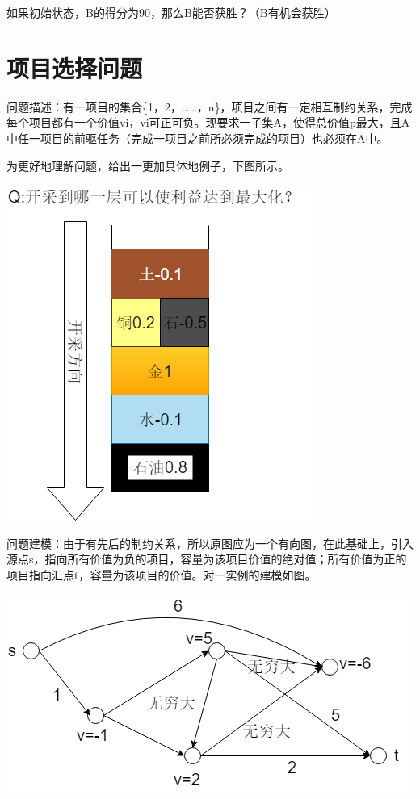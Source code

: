 如果初始状态，B的得分为90，那么B能否获胜？（B有机会获胜）

\section{项目选择问题}
问题描述：有一项目的集合\{1，2，……，n\}，项目之间有一定相互制约关系，完成每个项目都有一个价值vi，vi可正可负。现要求一子集A，使得总价值p最大，且A中任一项目的前驱任务（完成一项目之前所必须完成的项目）也必须在A中。

为更好地理解问题，给出一更加具体地例子，下图所示。

\centerline{\includegraphics[scale=0.6]{Ln11.image/networkflow8.png}}

问题建模：由于有先后的制约关系，所以原图应为一个有向图，在此基础上，引入源点s，指向所有价值为负的项目，容量为该项目价值的绝对值；所有价值为正的项目指向汇点t，容量为该项目的价值。对一实例的建模如图。

\centerline{\includegraphics[scale=0.6]{Ln11.image/networkflow9.png}}



